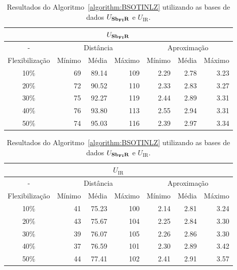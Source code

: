 \begin{table}[!htb]
  \caption{Resultados do Algoritmo~\ref{algorithm:BSOTINLZ} utilizando as bases de dados $U_{\textbf{Sb\textsubscript{FI}R}}{}$ e $U_{\text{IR}}$.}
  \label{table:APQPJYRX}
  \centering
  \begin{tabular}{|c|r|r|r|r|r|r|}
    \hline
    \multicolumn{7}{|c|}{$U_{\textbf{Sb\textsubscript{FI}R}}{}$}                                                                       \\ \hline
      -            & \multicolumn{3}{c|}{Distância}             & \multicolumn{3}{c|}{Aproximação}           \\ \hline
    Flexibilização & Mínimo       & Média        & Máximo       & Mínimo       & Média        & Máximo       \\ \hline  
    10\%           & 69           & 89.14        & 109          & 2.29         & 2.78         & 3.23         \\ \hline
    20\%           & 72           & 90.52        & 110          & 2.33         & 2.83         & 3.27         \\ \hline
    30\%           & 75           & 92.27        & 119          & 2.44         & 2.89         & 3.31         \\ \hline
    40\%           & 76           & 93.80        & 113          & 2.55         & 2.94         & 3.31         \\ \hline
    50\%           & 74           & 95.03        & 116          & 2.39         & 2.97         & 3.34         \\ \hline    
  \end{tabular}

  \vspace{5mm}

  \begin{tabular}{|c|r|r|r|r|r|r|}
    \hline
    \multicolumn{7}{|c|}{$U_{\text{IR}}$}                                                                    \\ \hline
      -            & \multicolumn{3}{c|}{Distância}             & \multicolumn{3}{c|}{Aproximação}           \\ \hline
    Flexibilização & Mínimo       & Média        & Máximo       & Mínimo       & Média        & Máximo       \\ \hline  
    10\%           & 41           & 75.23        & 100          & 2.14         & 2.81         & 3.24         \\ \hline
    20\%           & 43           & 75.67        & 104          & 2.25         & 2.84         & 3.30         \\ \hline
    30\%           & 39           & 76.07        & 105          & 2.26         & 2.86         & 3.30         \\ \hline
    40\%           & 37           & 76.59        & 101          & 2.30         & 2.89         & 3.42         \\ \hline
    50\%           & 44           & 77.41        & 102          & 2.41         & 2.91         & 3.57         \\ \hline    
  \end{tabular}
\end{table}


